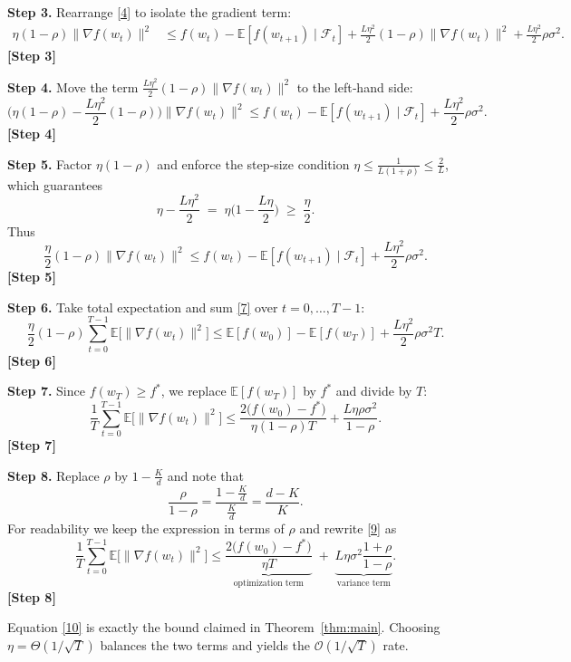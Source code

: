 \documentclass{article}
\begin{document}
\noindent\textbf{Step 3.} Rearrange \eqref{4} to isolate the gradient term:
\[
\begin{aligned}
\eta(1-\rho)\|\nabla f(w_t)\|^{2}
&\le f(w_t)-\mathbb{E}[f(w_{t+1})\mid\mathcal{F}_t]
   +\frac{L\eta^{2}}{2}(1-\rho)\|\nabla f(w_t)\|^{2}
   +\frac{L\eta^{2}}{2}\rho\sigma^{2}.
\end{aligned}
\tag{5}
\]
\textbf{[Step 3]}

\noindent\textbf{Step 4.} Move the term $\frac{L\eta^{2}}{2}(1-\rho)\|\nabla f(w_t)\|^{2}$ to the left‑hand side:
\[
\Big(\eta(1-\rho)-\frac{L\eta^{2}}{2}(1-\rho)\Big)\|\nabla f(w_t)\|^{2}
\le f(w_t)-\mathbb{E}[f(w_{t+1})\mid\mathcal{F}_t]
   +\frac{L\eta^{2}}{2}\rho\sigma^{2}.
\tag{6}
\]
\textbf{[Step 4]}

\noindent\textbf{Step 5.} Factor $\eta(1-\rho)$ and enforce the step‑size condition $\eta\le\frac{1}{L(1+\rho)}\le\frac{2}{L}$, which guarantees
\[
\eta-\frac{L\eta^{2}}{2}\;=\;\eta\Big(1-\frac{L\eta}{2}\Big)\;\ge\;\frac{\eta}{2}.
\]
Thus
\[
\frac{\eta}{2}(1-\rho)\|\nabla f(w_t)\|^{2}
\le f(w_t)-\mathbb{E}[f(w_{t+1})\mid\mathcal{F}_t]
   +\frac{L\eta^{2}}{2}\rho\sigma^{2}.
\tag{7}
\]
\textbf{[Step 5]}

\noindent\textbf{Step 6.} Take total expectation and sum \eqref{7} over $t=0,\dots,T-1$:
\[
\frac{\eta}{2}(1-\rho)\sum_{t=0}^{T-1}\mathbb{E}\big[\|\nabla f(w_t)\|^{2}\big]
\le \mathbb{E}[f(w_0)]-\mathbb{E}[f(w_T)]
   +\frac{L\eta^{2}}{2}\rho\sigma^{2}T.
\tag{8}
\]
\textbf{[Step 6]}

\noindent\textbf{Step 7.} Since $f(w_T)\ge f^{*}$, we replace $\mathbb{E}[f(w_T)]$ by $f^{*}$ and divide by $T$:
\[
\frac{1}{T}\sum_{t=0}^{T-1}\mathbb{E}\big[\|\nabla f(w_t)\|^{2}\big]
\le
\frac{2\big(f(w_0)-f^{*}\big)}{\eta(1-\rho)T}
   +\frac{L\eta\rho\sigma^{2}}{1-\rho}.
\tag{9}
\]
\textbf{[Step 7]}

\noindent\textbf{Step 8.} Replace $\rho$ by $1-\frac{K}{d}$ and note that
\[
\frac{\rho}{1-\rho}= \frac{1-\frac{K}{d}}{\frac{K}{d}} = \frac{d-K}{K}.
\]
For readability we keep the expression in terms of $\rho$ and rewrite \eqref{9} as
\[
\frac{1}{T}\sum_{t=0}^{T-1}\mathbb{E}\big[\|\nabla f(w_t)\|^{2}\big]
\le
\underbrace{\frac{2\big(f(w_0)-f^{*}\big)}{\eta T}}_{\text{optimization term}}
\;+\;
\underbrace{L\eta\sigma^{2}\frac{1+\rho}{1-\rho}}_{\text{variance term}}.
\tag{10}
\]
\textbf{[Step 8]}

Equation \eqref{10} is exactly the bound claimed in Theorem~\ref{thm:main}.  Choosing $\eta = \Theta(1/\sqrt{T})$ balances the two terms and yields the $\mathcal{O}(1/\sqrt{T})$ rate.
\end{document}
